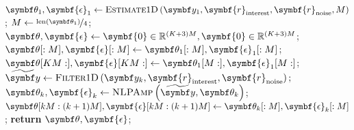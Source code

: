 \begin{algorithm}
    \caption[
        Routine for estimating a sequence of \ac{1D} \acsp{FID} which exhibit
        variation in amplitudes across increments.
    ]
    {
        Routine for estimating a sequence of \ac{1D} \acsp{FID} which exhibit
        variation in amplitudes across increments.
        \textsc{NLPAmp} denotes a
        routine which is akin to \textsc{NLP} (\cref{alg:nlp}), except
        only amplitudes are allowed to be altered, whilst phases, frequencies
        and damping factors are fixed.
    }
    \label{alg:estimate-seq}
    \begin{algorithmic}[1]
        \State $\bth_{1}, \symbf{\epsilon}_{1} \gets \textsc{Estimate$1$D}\left(
            \by_1, \symbf{r}_{\text{interest}}, \symbf{r}_{\text{noise}}, M
            \right)
        $;
        \State $M \gets \nicefrac{\text{len}(\bth_{1})}{4}$;
        \State $\bth, \symbf{\epsilon} \gets  \symbf{0} \in \mathbb{R}^{(K + 3)M}, \symbf{0} \in \mathbb{R}^{(K + 3)M}$;
        \State $\bth[:M], \symbf{\epsilon}[:M] \gets \bth_1[:M], \symbf{\epsilon}_1[:M]$;
        \State $\bth[KM:], \symbf{\epsilon}[KM:] \gets \bth_1[M:], \symbf{\epsilon}_1[M:]$;
            \State $\widetilde{\by} \gets \textsc{Filter$1$D}\left(
                \by_k,
                \symbf{r}_{\text{interest}},
                \symbf{r}_{\text{noise}}
                \right);
                $
            \State $\bth_{k}, \symbf{\epsilon}_{k} \gets
            \textsc{NLPAmp}\left(\widetilde{\by}, \bth_{k}\right)$;
            \State $\bth[kM : (k+1)M], \symbf{\epsilon}[kM : (k+1)M] \gets \bth_k[:M], \symbf{\epsilon}_k[:M]$;
        \EndFor
        \State \textbf{return} $\bth, \symbf{\epsilon}$;
        \EndProcedure
    \end{algorithmic}
\end{algorithm}

